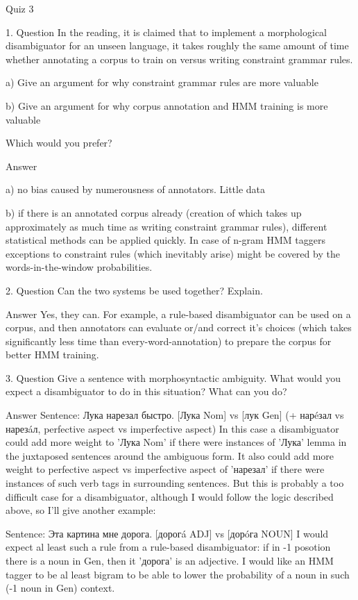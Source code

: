

Quiz 3


1. Question
In the reading, it is claimed that to implement a morphological disambiguator for an unseen language, it takes roughly the same amount of time whether annotating a corpus to train on versus writing constraint grammar rules.

a) Give an argument for why constraint grammar rules are more valuable

b) Give an argument for why corpus annotation and HMM training is more valuable

Which would you prefer?

Answer

a) no bias caused by numerousness of annotators. Little data

b) if there is an annotated corpus already (creation of which takes up approximately as much time as writing constraint grammar rules), different statistical methods can be applied quickly. In case of n-gram HMM taggers exceptions to constraint rules (which inevitably arise) might be covered by the words-in-the-window probabilities.


2. Question
Can the two systems be used together? Explain.
 
 Answer
Yes, they can. For example, a rule-based disambiguator can be used on a corpus, and then annotators can evaluate or/and correct it's choices (which takes significantly less time than every-word-annotation) to prepare the corpus for better HMM training.


 3. Question
Give a sentence with morphosyntactic ambiguity. What would you expect a disambiguator to do in this situation? What can you do?
 
 Answer
  Sentence: Лука нарезал быстро. [Лука  Nom] vs [лук  Gen] (+ нарéзал vs нарезáл, perfective aspect vs imperfective aspect)
   In this case a disambiguator could add more weight to 'Лука Nom' if there were instances of 'Лука' lemma in the juxtaposed sentences around the ambiguous form. It also could add more weight to perfective aspect vs imperfective aspect of 'нарезал' if there were instances of such verb tags in surrounding sentences. But this is probably a too difficult case for a disambiguator, although I would follow the logic described above, so I'll give another example:
   
  Sentence: Эта картина мне дорога. [дорогá  ADJ] vs [дорóга  NOUN] 
   I would expect al least such a rule from a rule-based disambiguator: if in -1 posotion there is a noun in Gen, then it 'дорога' is an adjective.
   I would like an HMM tagger to be al least bigram to be able to lower the probability of a noun in such (-1 noun in Gen) context.
  
